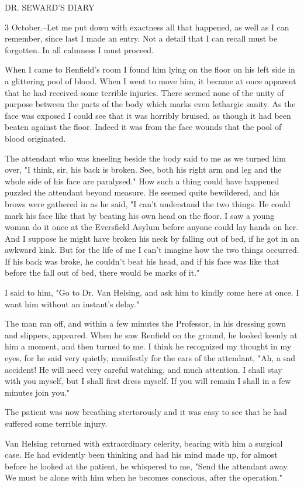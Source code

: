 DR. SEWARD'S DIARY 

3 October.--Let me put down with exactness all that happened, as well as I can remember, since last I made an entry. Not a detail that I can recall must be forgotten. In all calmness I must proceed. 

When I came to Renfield's room I found him lying on the floor on his left side in a glittering pool of blood. When I went to move him, it became at once apparent that he had received some terrible injuries. There seemed none of the unity of purpose between the parts of the body which marks even lethargic sanity. As the face was exposed I could see that it was horribly bruised, as though it had been beaten against the floor. Indeed it was from the face wounds that the pool of blood originated. 

The attendant who was kneeling beside the body said to me as we turned him over, "I think, sir, his back is broken. See, both his right arm and leg and the whole side of his face are paralysed." How such a thing could have happened puzzled the attendant beyond measure. He seemed quite bewildered, and his brows were gathered in as he said, "I can't understand the two things. He could mark his face like that by beating his own head on the floor. I saw a young woman do it once at the Eversfield Asylum before anyone could lay hands on her. And I suppose he might have broken his neck by falling out of bed, if he got in an awkward kink. But for the life of me I can't imagine how the two things occurred. If his back was broke, he couldn't beat his head, and if his face was like that before the fall out of bed, there would be marks of it." 

I said to him, "Go to Dr. Van Helsing, and ask him to kindly come here at once. I want him without an instant's delay." 

The man ran off, and within a few minutes the Professor, in his dressing gown and slippers, appeared. When he saw Renfield on the ground, he looked keenly at him a moment, and then turned to me. I think he recognized my thought in my eyes, for he said very quietly, manifestly for the ears of the attendant, "Ah, a sad accident! He will need very careful watching, and much attention. I shall stay with you myself, but I shall first dress myself. If you will remain I shall in a few minutes join you." 

The patient was now breathing stertorously and it was easy to see that he had suffered some terrible injury. 

Van Helsing returned with extraordinary celerity, bearing with him a surgical case. He had evidently been thinking and had his mind made up, for almost before he looked at the patient, he whispered to me, "Send the attendant away. We must be alone with him when he becomes conscious, after the operation." 

